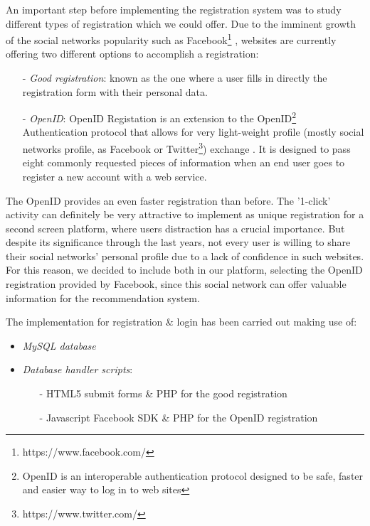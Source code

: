 \documentclass{acm_proc_article-sp}
\begin{document}
An important step before implementing the registration system was to study different types of registration which we could offer. Due to the imminent growth of the social networks popularity such as Facebook\footnote{https://www.facebook.com/} \cite{shih2009facebook}, websites are currently offering two different options to accomplish a registration:

\begin{itemize}
  	\item [-]\textit{Good registration}: known as the one where a user fills in directly the registration form with their personal data. 
	\item [-]\textit{OpenID}: OpenID Registation is an extension to the OpenID\footnote{OpenID is an interoperable authentication protocol designed to be safe, faster and easier way to log in to web sites} Authentication protocol that allows for very light-weight profile (mostly social networks profile, as Facebook or Twitter\footnote{https://www.twitter.com/}) exchange . It is designed to pass eight commonly requested pieces of information when an end user goes to register a new account with a web service. 
\end{itemize}

The OpenID provides an even faster registration than before. The '1-click' activity can definitely be very attractive to implement as unique registration for a second screen platform\cite{allen2012smashing}, where users distraction has a crucial importance. But despite its significance through the last years, not every user is willing to share their social networks' personal profile due to a lack of confidence in such websites\cite{pu2006trust}. For this reason, we decided to include both in our platform, selecting the OpenID registration provided by Facebook, since this social network can offer valuable information for the recommendation system. 


The implementation for registration \& login has been carried out making use of:

\begin{itemize}
  	\item \textit{MySQL database}
	\item \textit{Database handler scripts}: 
	\begin{itemize}
  		\item [-]HTML5 submit forms \& PHP for the good registration 
		\item [-]Javascript Facebook SDK \& PHP for the OpenID registration 
	\end{itemize}
\end{itemize}
\end{document}
